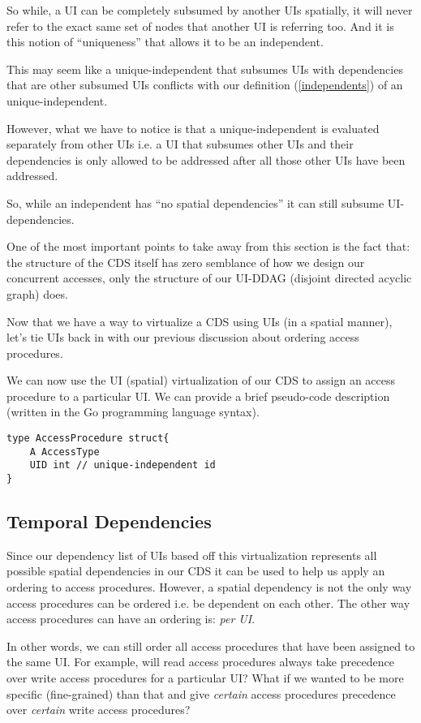 So while, a UI can be completely subsumed by another UIs spatially, it will never refer to the exact same set of nodes that another UI is referring too. And it is this notion of ``uniqueness'' that allows it to be an independent.

This may seem like a unique-independent that subsumes UIs with dependencies that are other subsumed UIs conflicts with our definition (\ref{independents}) of an unique-independent. 

However, what we have to notice is that a unique-independent is evaluated separately from other UIs i.e. a UI that subsumes other UIs and their dependencies is only allowed to be addressed after all those other UIs have been addressed.

So, while an independent has ``no spatial dependencies'' it can still subsume UI-dependencies. 

One of the most important points to take away from this section is the fact that: the structure of the CDS itself has zero semblance of how we design our concurrent accesses, only the structure of our UI-DDAG (disjoint directed acyclic graph) does.

Now that we have a way to virtualize a CDS using UIs (in a spatial manner), let's tie UIs back in with our previous discussion about ordering access procedures.

We can now use the UI (spatial) virtualization of our CDS to assign an access procedure to a particular UI. We can provide a brief pseudo-code description (written in the Go programming language syntax).

\begin{verbatim}
type AccessProcedure struct{
	A AccessType
	UID int // unique-independent id
}
\end{verbatim}

\subsection{Temporal Dependencies}

Since our dependency list of UIs based off this virtualization represents all possible spatial dependencies in our CDS it can be used to help us apply an ordering to access procedures. However, a spatial dependency is not the only way access procedures can be ordered i.e. be dependent on each other. The other way access procedures can have an ordering is: \textit{per UI}.

In other words, we can still order all access procedures that have been assigned to the same UI. For example, will read access procedures always take precedence over write access procedures for a particular UI? What if we wanted to be more specific (fine-grained) than that and give \textit{certain} access procedures precedence over \textit{certain} write access procedures?

